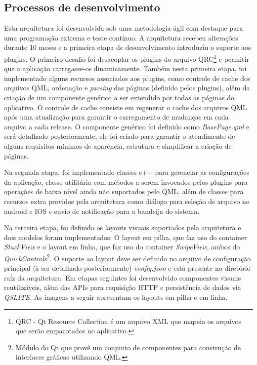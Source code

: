 \subsection{Processos de desenvolvimento}
Esta arquitetura foi desenvolvida sob uma metodologia ágil com destaque para uma programação extrema e teste contínuo. A arquitetura recebeu alterações durante 10 meses e a primeira etapa de desenvolvimento introduziu o suporte aos plugins. O primeiro desafio foi desacoplar os plugins do arquivo QRC\footnote{QRC - Qt Resource Collection é um arquivo XML que mapeia os arquivos que serão empacotados no aplicativo.} e permitir que a aplicação carregasse-os dinamicamente. Também nesta primeira etapa, foi implementado alguns recursos associados aos plugins, como controle de cache dos arquivos QML, ordenação e \textit{parsing} das páginas (definido pelos plugins), além da criação de um componente genérico a ser extendido por todas as páginas do aplicativo. O controle de cache consiste em regenerar o cache dos arquivos QML após uma atualização para garantir o carregamento de mudanças em cada arquivo a cada release. O componente genérico foi definido como \textit{BasePage.qml} e será detalhado posteriormente, ele foi criado para garantir o atendimento de alguns requisitos mínimos de aparência, estrutura e simplificar a criação de páginas.\par

Na segunda etapa, foi implementado classes c++ para gerenciar as configurações da aplicação, classe utilitária com métodos a serem invocados pelos plugins para operações de baixo nível ainda não suportados pelo QML, além de classes para recursos extra providos pela arquitetura como diálogo para seleção de arquivo no android e IOS e envio de notificação para a bandeija do sistema.\par

Na terceira etapa, foi definido os layouts visuais suportados pela arquitetura e dois modelos foram implementados: O layout em pilha, que faz uso do container \textit{StackView} e o layout em linha, que faz uso do container \textit{SwipeView}, ambos do \textit{QuickControls}\footnote{Módulo do Qt que provê um conjunto de componentes para construção de interfaces gráficas utilizando QML.}. O suporte ao layout deve ser definido no arquivo de configuração principal (à ser detalhado posteriormente) \textit{config.json} e está presente no diretório raíz da arquitetura. Em etapas seguintes foi desenvolvido componentes visuais reutilizáveis, além das APIs para requisição HTTP e persistência de dados via \textit{QSLITE}. As imagens a seguir apresentam os layouts em pilha e em linha.

